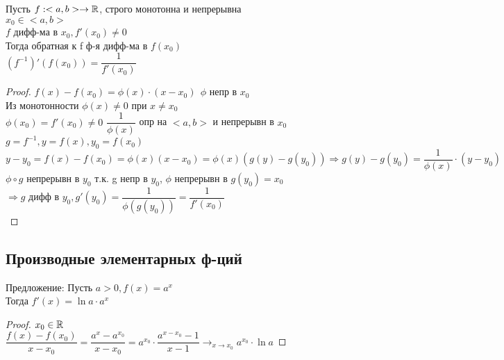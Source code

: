 \begin{theorem}
	Пусть $ f : <a, b> \rightarrow \mathbb{R} $, строго монотонна и непрерывна \\
	$ x_0 \in <a,b> $ \\
	$ f $ дифф-ма в $ x_0,  f'(x_0) \neq 0 $ \\
	Тогда обратная к f ф-я дифф-ма в $ f(x_0) $ \\
	$ (f^{-1})'(f(x_0)) = \dfrac{1}{f'(x_0)} $ \\
	\begin{proof}
		$ f(x) - f(x_0) = \phi(x) \cdot (x - x_0) \ \ \phi $ непр в $ x_0 $ \\
		Из монотонности $ \phi(x) \neq 0 $ при $ x \neq x_0 $ \\
		$ \phi(x_0) = f'(x_0) \neq 0 $
		$ \dfrac{1}{\phi(x)} $ опр на $ < a, b> $ и непрерывн в $ x_0 $ \\
		$ g = f^{-1}, y = f(x), y_0 = f(x_0) $ \\
		$ y - y_0 = f(x) - f(x_0) = \phi(x) (x - x_0) = \phi(x)( g(y) - g(y_0) ) \Rightarrow g(y) - g(y_0) = \dfrac{1}{\phi(x)} \cdot (y - y_0) $\\
		$ \phi \circ g $ непрерывн в $ y_0 $ т.к. g непр в $y_0$, $ \phi $ непрерывн в $ g(y_0) = x_0 $ \\
		$ \Rightarrow g $ дифф в $y_0, g'(y_0) = \dfrac{1}{\phi(g(y_0))} = \dfrac{1}{f'(x_0)}$ \\ 
  	\end{proof}
\end{theorem}

\subsection{Производные элементарных ф-ций}

Предложение: Пусть $ a > 0, f(x) = a^x $ \\
Тогда $ f'(x) = \ln a \cdot a^x $ \\
\begin{proof}
	$ x_0 \in \mathbb{R} $ \\
	$ \dfrac{f(x) - f(x_0)}{x - x_0} = \dfrac{a^x - a^{x_0}}{x - x_0} = a^{x_0} \cdot \dfrac{a^{x-x_0} - 1}{x - 1} \rightarrow_{x \rightarrow x_0} a^{x_0} \cdot \ln a $
\end{proof}


